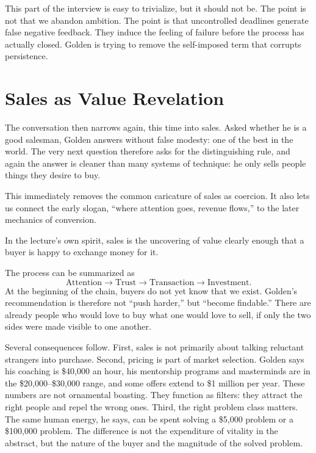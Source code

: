 This part of the interview is easy to trivialize, but it should not be. The point is not that we abandon ambition. The point is that uncontrolled deadlines generate false negative feedback. They induce the feeling of failure before the process has actually closed. Golden is trying to remove the self-imposed term that corrupts persistence.

\section{Sales as Value Revelation}

The conversation then narrows again, this time into sales. Asked whether he is a good salesman, Golden answers without false modesty: one of the best in the world. The very next question therefore asks for the distinguishing rule, and again the answer is cleaner than many systems of technique: he only sells people things they desire to buy.

This immediately removes the common caricature of sales as coercion. It also lets us connect the early slogan, ``where attention goes, revenue flows,'' to the later mechanics of conversion.

\begin{definition}
In the lecture's own spirit, sales is the uncovering of value clearly enough that a buyer is happy to exchange money for it.
\end{definition}

The process can be summarized as
\begin{equation}
\text{Attention} \rightarrow \text{Trust} \rightarrow \text{Transaction} \rightarrow \text{Investment}.
\end{equation}
At the beginning of the chain, buyers do not yet know that we exist. Golden's recommendation is therefore not ``push harder,'' but ``become findable.'' There are already people who would love to buy what one would love to sell, if only the two sides were made visible to one another.

Several consequences follow. First, sales is not primarily about talking reluctant strangers into purchase. Second, pricing is part of market selection. Golden says his coaching is \$40,000 an hour, his mentorship programs and masterminds are in the \$20,000--\$30,000 range, and some offers extend to \$1 million per year. These numbers are not ornamental boasting. They function as filters: they attract the right people and repel the wrong ones. Third, the right problem class matters. The same human energy, he says, can be spent solving a \$5,000 problem or a \$100,000 problem. The difference is not the expenditure of vitality in the abstract, but the nature of the buyer and the magnitude of the solved problem.


